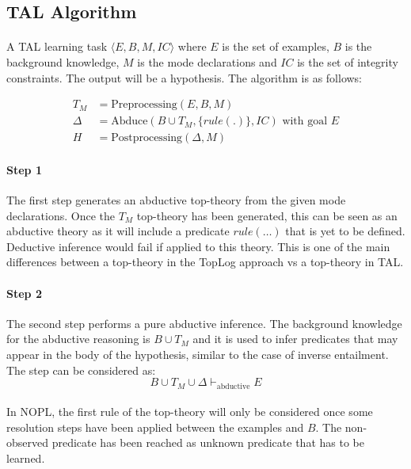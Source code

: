 \documentclass{article}
\theoremstyle{plain}
\theoremstyle{definition}
\begin{document}
\begin{multicols}{2}
\subsection{TAL Algorithm}

\paragraph{} A TAL learning task $\langle E, B, M, IC\rangle$ where $E$ is the set of examples, $B$ is the background knowledge, $M$ is the mode declarations and $IC$ is the set of integrity constraints. The output will be a hypothesis. The algorithm is as follows:

\begin{align*}
T_M &= \text{Preprocessing}(E, B, M)\\
\Delta &= \text{Abduce}(B \cup T_M, \{rule(.)\}, IC) \text{ with goal }E\\
H &= \text{Postprocessing}(\Delta, M)
\end{align*}

\paragraph{Step 1} The first step generates an abductive top-theory from the given mode declarations. Once the $T_M$ top-theory has been generated, this can be seen as an abductive theory as it will include a predicate $rule(\dots)$ that is yet to be defined. Deductive inference would fail if applied to this theory. This is one of the main differences between a top-theory in the TopLog approach vs a top-theory in TAL.

\paragraph{Step 2} The second step performs a pure abductive inference. The background knowledge for the abductive reasoning is $B \cup T_M$ and it is used to infer predicates that may appear in the body of the hypothesis, similar to the case of inverse entailment. The step can be considered as: $$B \cup T_M \cup \Delta \vdash_\text{abductive} E$$

\paragraph{} In NOPL, the first rule of the top-theory will only be considered once some resolution steps have been applied between the examples and $B$. The non-observed predicate has been reached as unknown predicate that has to be learned.


\end{multicols}
\end{document}
